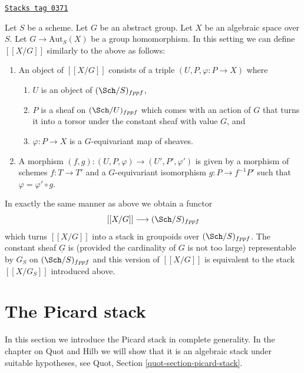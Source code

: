 \begin{remark}
\label{examples-stacks-remark-X-mod-G-group}
\href{https://stacks.math.columbia.edu/tag/0371}{\texttt{Stacks tag 0371}}

Let $S$ be a scheme.
Let $G$ be an abstract group.
Let $X$ be an algebraic space over $S$.
Let $G \to \text{Aut}_S(X)$ be a group homomorphism.
In this setting we can define $[[X/G]]$ similarly
to the above as follows:
\begin{enumerate}
\item An object of $[[X/G]]$ consists of a triple
$(U, P, \varphi : P \to X)$ where
\begin{enumerate}
\item $U$ is an object of $(\Sch/S)_{fppf}$,
\item $P$ is a sheaf on $(\Sch/U)_{fppf}$ which comes
with an action of $G$ that turns it into a torsor under the constant
sheaf with value $G$, and
\item $\varphi : P \to X$ is a $G$-equivariant map of sheaves.
\end{enumerate}
\item A morphism
$(f, g) : (U, P, \varphi) \to (U', P', \varphi')$
is given by a morphism of schemes $f : T \to T'$
and a $G$-equivariant isomorphism
$g : P \to f^{-1}P'$ such that $\varphi = \varphi' \circ g$.
\end{enumerate}
In exactly the same manner as above we obtain a functor
$$
[[X/G]] \longrightarrow (\Sch/S)_{fppf}
$$
which turns $[[X/G]]$ into a stack in groupoids over $(\Sch/S)_{fppf}$.
The constant sheaf $\underline{G}$ is (provided the cardinality of $G$ is
not too large) representable by $G_S$ on $(\Sch/S)_{fppf}$
and this version of $[[X/G]]$ is equivalent to the stack
$[[X/G_S]]$ introduced above.
\end{remark}

\section{The Picard stack}
\label{examples-stacks-section-picard-stack}
In this section we introduce the Picard stack in complete generality.
In the chapter on Quot and Hilb we will show that it is an algebraic
stack under suitable hypotheses, see
Quot, Section \ref{quot-section-picard-stack}.

